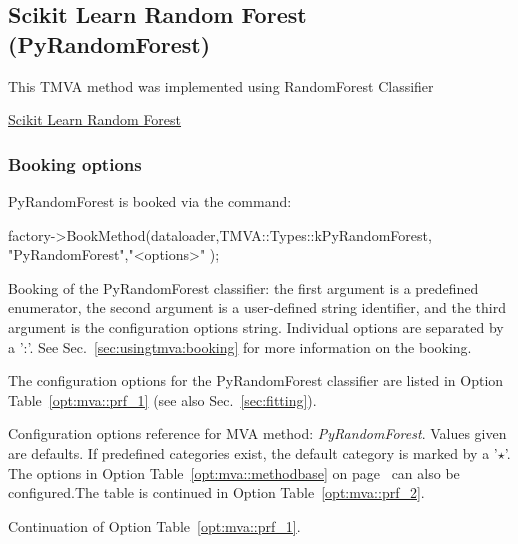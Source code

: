 \subsection{Scikit Learn Random Forest (PyRandomForest)}
\label{sec:PyRandomForest}

This TMVA method was implemented using RandomForest Classifier 

\href{http://scikit-learn.org/stable/modules/ensemble.html#forests-of-randomized-trees}{Scikit Learn Random Forest}


\subsubsection{Booking options}

PyRandomForest is booked via the command:
\begin{codeexample}
\begin{tmvacode}
factory->BookMethod(dataloader,TMVA::Types::kPyRandomForest, "PyRandomForest","<options>" );
\end{tmvacode}
\caption[.]{\codeexampleCaptionSize Booking of the PyRandomForest classifier: the first argument is 
		   a predefined enumerator, the second argument is a user-defined 
		   string identifier, and the third argument is the configuration options string.
         Individual options are separated by a ':'. 
         See Sec.~\ref{sec:usingtmva:booking} for more information on the booking.}
\end{codeexample}

The configuration options for the PyRandomForest classifier are listed in Option Table~\ref{opt:mva::prf_1}
(see also Sec.~\ref{sec:fitting}).

\begin{option}[p]

\caption[.]{\optionCaptionSize 
     Configuration options reference for MVA method: {\em PyRandomForest}.
     Values given are defaults. If predefined categories exist, the default category 
     is marked by a '$\star$'. The options in Option Table~\ref{opt:mva::methodbase} on 
     page~\pageref{opt:mva::methodbase} can also be configured.The table
      is continued in Option Table~\ref{opt:mva::prf_2}.  
}
\label{opt:mva::prf_1}
\end{option}

\begin{option}[p]

\caption[.]{\optionCaptionSize 
     Continuation of Option Table~\ref{opt:mva::prf_1}.     
}
\label{opt:mva::prf_2}
\end{option}

